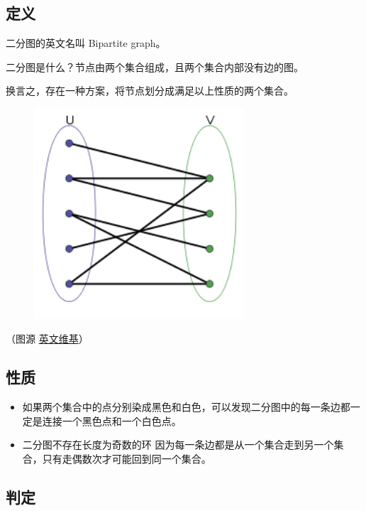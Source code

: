 
\subsection{定义}

二分图的英文名叫 Bipartite graph。

二分图是什么？节点由两个集合组成，且两个集合内部没有边的图。

换言之，存在一种方案，将节点划分成满足以上性质的两个集合。

\begin{figure}[htbp]
\centering
\includegraphics[width=0.7\textwidth]{docs/graph/images/bi-graph.png} 

\end{figure}

（图源 \href{https://en.wikipedia.org/wiki/Bipartite_graph}{英文维基}）

\subsection{性质}

\begin{itemize}
\item 如果两个集合中的点分别染成黑色和白色，可以发现二分图中的每一条边都一定是连接一个黑色点和一个白色点。
\item \begin{QUESTION}{二分图不存在长度为奇数的环}{}
  因为每一条边都是从一个集合走到另一个集合，只有走偶数次才可能回到同一个集合。
\end{QUESTION}

\end{itemize}

\subsection{判定}

